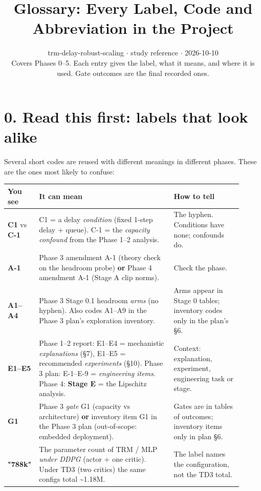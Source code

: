\documentclass[11pt]{article}
\title{Glossary: Every Label, Code and Abbreviation in the Project}
\author{}
\date{trm-delay-robust-scaling $\cdot$ study reference $\cdot$ 2026-10-10\\[2pt]Covers Phases 0--5. Each entry gives the label, what it means, and where it is used. Gate outcomes are the final recorded ones.}
\begin{document}
\maketitle
\tableofcontents
\clearpage



\section*{0. Read this first: labels that look alike}



Several short codes are reused with different meanings in different phases. These are the ones most likely to confuse:



\begin{center}\small\begin{tabular}{>{\raggedright\arraybackslash}p{0.069\linewidth}>{\raggedright\arraybackslash}p{0.557\linewidth}>{\raggedright\arraybackslash}p{0.280\linewidth}}
\toprule
You see & It can mean & How to tell \\
\midrule
\textbf{C1} vs \textbf{C-1} & C1 = a delay \emph{condition} (fixed 1-step delay + queue). C-1 = the \emph{capacity confound} from the Phase 1--2 analysis. & The hyphen. Conditions have none; confounds do. \\
\textbf{A-1} & Phase 3 amendment A-1 (theory check on the headroom probe) \textbf{or} Phase 4 amendment A-1 (Stage A clip norms). & Check the phase. \\
\textbf{A1--A4} & Phase 3 Stage 0.1 headroom \emph{arms} (no hyphen). Also codes A1--A9 in the Phase 3 plan's exploration inventory. & Arms appear in Stage 0 tables; inventory codes only in the plan's \S{}6. \\
\textbf{E1--E5} & Phase 1--2 report: E1--E4 = mechanistic \emph{explanations} (\S{}7), E1--E5 = recommended \emph{experiments} (\S{}10). Phase 3 plan: E-1--E-9 = \emph{engineering items}. Phase 4: \textbf{Stage E} = the Lipschitz analysis. & Context: explanation, experiment, engineering task or stage. \\
\textbf{G1} & Phase 3 \emph{gate} G1 (capacity vs architecture) \textbf{or} inventory item G1 in the Phase 3 plan (out-of-scope: embedded deployment). & Gates are in tables of outcomes; inventory items only in plan \S{}6. \\
\textbf{"788k"} & The parameter count of TRM / MLP \emph{under DDPG} (actor + one critic). Under TD3 (two critics) the same configs total \textasciitilde{}1.18M. & The label names the configuration, not the TD3 total. \\

\end{tabular}
\end{center}
\end{document}
